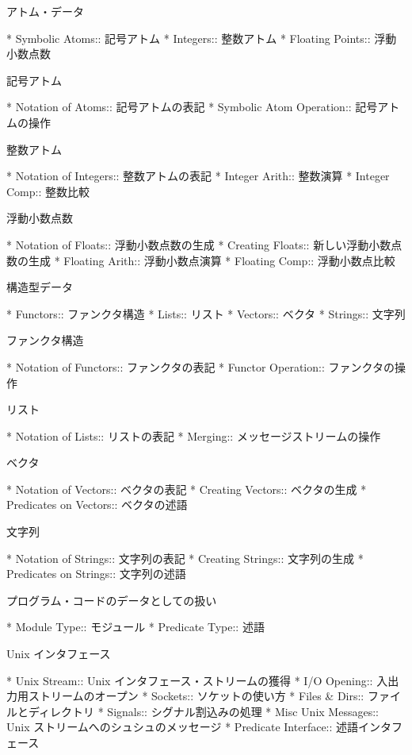アトム・データ

* Symbolic Atoms::              記号アトム
* Integers::                    整数アトム
* Floating Points::             浮動小数点数

記号アトム

* Notation of Atoms::           記号アトムの表記
* Symbolic Atom Operation::     記号アトムの操作

整数アトム

* Notation of Integers::        整数アトムの表記
* Integer Arith::               整数演算
* Integer Comp::                整数比較

浮動小数点数

* Notation of Floats::          浮動小数点数の生成
* Creating Floats::             新しい浮動小数点数の生成
* Floating Arith::              浮動小数点演算
* Floating Comp::               浮動小数点比較

構造型データ

* Functors::                    ファンクタ構造
* Lists::                       リスト
* Vectors::                     ベクタ
* Strings::                     文字列

ファンクタ構造

* Notation of Functors::        ファンクタの表記
* Functor Operation::           ファンクタの操作

リスト

* Notation of Lists::           リストの表記
* Merging::                     メッセージストリームの操作

ベクタ

* Notation of Vectors::         ベクタの表記
* Creating Vectors::            ベクタの生成
* Predicates on Vectors::       ベクタの述語

文字列

* Notation of Strings::         文字列の表記
* Creating Strings::            文字列の生成
* Predicates on Strings::       文字列の述語

プログラム・コードのデータとしての扱い

* Module Type::                 モジュール
* Predicate Type::              述語

Unix インタフェース

* Unix Stream::                 Unix インタフェース・ストリームの獲得
* I/O Opening::                 入出力用ストリームのオープン
* Sockets::                     ソケットの使い方
* Files & Dirs::                ファイルとディレクトリ
* Signals::                     シグナル割込みの処理
* Misc Unix Messages::          Unix ストリームへのシュシュのメッセージ
* Predicate Interface::         述語インタフェース


